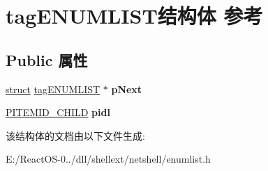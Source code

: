 \hypertarget{structtag_e_n_u_m_l_i_s_t}{}\section{tag\+E\+N\+U\+M\+L\+I\+S\+T结构体 参考}
\label{structtag_e_n_u_m_l_i_s_t}
\subsection*{Public 属性}
\begin{DoxyCompactItemize}
\item 
\mbox{\label{structtag_e_n_u_m_l_i_s_t_a93eba7a0ca8dd47cee2a45ef063fea47}} 
\hyperlink{interfacestruct}{struct} \hyperlink{structtag_e_n_u_m_l_i_s_t}{tag\+E\+N\+U\+M\+L\+I\+ST} $\ast$ {\bfseries p\+Next}
\item 
\mbox{\label{structtag_e_n_u_m_l_i_s_t_a9e82a29eb08f542270dd93077b753f37}} 
\hyperlink{struct___i_t_e_m_i_d___c_h_i_l_d}{P\+I\+T\+E\+M\+I\+D\+\_\+\+C\+H\+I\+LD} {\bfseries pidl}
\end{DoxyCompactItemize}


该结构体的文档由以下文件生成\+:\begin{DoxyCompactItemize}
\item 
E\+:/\+React\+O\+S-\/0../dll/shellext/netshell/enumlist.\+h\end{DoxyCompactItemize}
